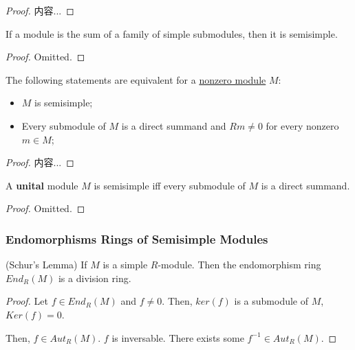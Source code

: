 \documentclass[Total.tex]{subfiles}
\begin{document}
	\begin{proof}
		内容...
	\end{proof}
	
	\begin{corollary}
		If a module is the sum of a family of simple submodules, then it is semisimple.
	\end{corollary}
	
	\begin{proof}
		Omitted.
	\end{proof}
	
	\begin{lemma}
		The following statements are equivalent for a \underline{nonzero module} $M$:
		
		\begin{itemize}
			\item $M$ is semisimple;
			\item Every submodule of $M$ is a direct summand and $Rm\not=0$ for every nonzero $m\in M$;
		\end{itemize}
	\end{lemma}
	
	\begin{proof}
		内容...
	\end{proof}
	
	\begin{corollary}
		A \textbf{unital} module $M$ is semisimple iff every submodule of $M$ is a direct summand.
	\end{corollary}
	
	\begin{proof}
		Omitted.
	\end{proof}
	\subsubsection{Endomorphisms Rings of Semisimple Modules}
	
	\begin{theorem}
		(Schur's Lemma) If $M$ is a simple $R$-module. Then the endomorphism ring $End_R(M)$ is a division ring.	\label{Schurs-Lemma-for-Endomorphism-of-Simple-Modules}
	\end{theorem}
	
	\begin{proof}
		Let $f\in End_R(M)$ and $f\not=0$. Then, $ker(f)$ is a submodule of $M$, $Ker(f)=0$. 
		
		Then, $f\in Aut_R(M)$. $f$ is inversable. There exists some $f^{-1}\in Aut_R(M)$.
	\end{proof}
	
\end{document}
